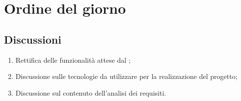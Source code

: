 \section{Ordine del giorno} \label{sec:agenda}
\subsection{Discussioni} \label{subsec:discussione}
\begin{enumerate}
    \item Rettifica delle funzionalità attese dal ;
    \item Discussione sulle tecnologie da utilizzare per la realizzazione del progetto;
    \item Discussione sul contenuto dell'analisi dei requisiti.
\end{enumerate}
